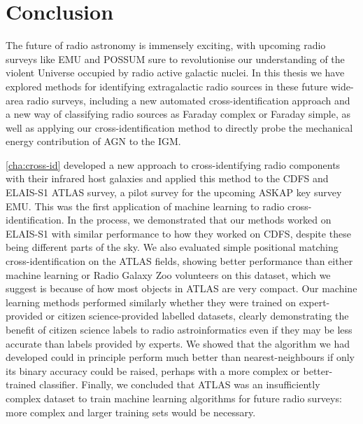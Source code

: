 \chapter{Conclusion}
\label{cha:conc}



The future of radio astronomy is immensely exciting, with upcoming radio surveys like EMU and POSSUM sure to revolutionise our understanding of the violent Universe occupied by radio active galactic nuclei. In this thesis we have explored methods for identifying extragalactic radio sources in these future wide-area radio surveys, including a new automated cross-identification approach and a new way of classifying radio sources as Faraday complex or Faraday simple, as well as applying our cross-identification method to directly probe the mechanical energy contribution of AGN to the IGM. 

\autoref{cha:cross-id} developed a new approach to cross-identifying radio components with their infrared host galaxies and applied this method to the CDFS and ELAIS-S1 ATLAS survey, a pilot survey for the upcoming ASKAP key survey EMU. This was the first application of machine learning to radio cross-identification. In the process, we demonstrated that our methods worked on ELAIS-S1 with similar performance to how they worked on CDFS, despite these being different parts of the sky. We also evaluated simple positional matching cross-identification on the ATLAS fields, showing better performance than either machine learning or Radio Galaxy Zoo volunteers on this dataset, which we suggest is because of how most objects in ATLAS are very compact. Our machine learning methods performed similarly whether they were trained on expert-provided or citizen science-provided labelled datasets, clearly demonstrating the benefit of citizen science labels to radio astroinformatics even if they may be less accurate than labels provided by experts. We showed that the algorithm we had developed could in principle perform much better than nearest-neighbours if only its binary accuracy could be raised, perhaps with a more complex or better-trained classifier. Finally, we concluded that ATLAS was an insufficiently complex dataset to train machine learning algorithms for future radio surveys: more complex and larger training sets would be necessary.

